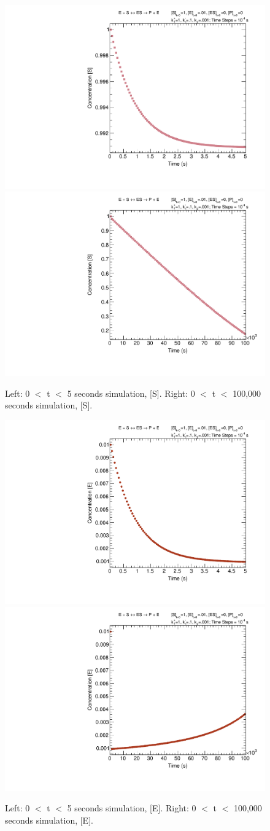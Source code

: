 \documentclass{article}
\begin{document}
\begin{figure}[H]
    \centering
    \includegraphics[width=.49\textwidth]{canv5_S_c.pdf} 
    \includegraphics[width=.49\textwidth]{canv100k_S_c.pdf}
    \caption{Left: 0 $<$ t $<$ 5 seconds simulation, [S]. Right: 0 $<$ t $<$ 100,000 seconds simulation, [S].}
    \label{}
\end{figure}

\begin{figure}[H]
    \centering
    \includegraphics[width=.49\textwidth]{canv5_E_c.pdf} 
    \includegraphics[width=.49\textwidth]{canv100k_E_c.pdf}
    \caption{Left: 0 $<$ t $<$ 5 seconds simulation, [E]. Right: 0 $<$ t $<$ 100,000 seconds simulation, [E].}
    \label{}
\end{figure}
\end{document}
